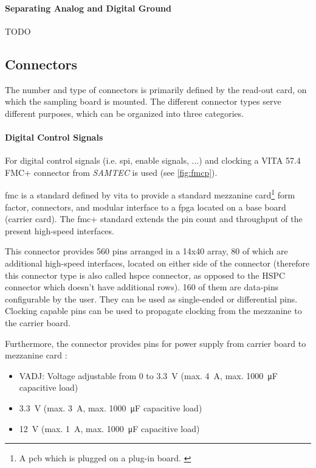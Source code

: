 \paragraph{Separating Analog and Digital Ground}
TODO



\subsection{Connectors}\label{sec:connectors}
The number and type of connectors is primarily defined by the read-out card, on which the sampling board is mounted. The different connector types serve different purposes, which can be organized into three categories.
\paragraph{Digital Control Signals}
For digital control signals (i.e. \gls{spi}, enable signals, ...) and clocking a VITA 57.4 FMC+ connector from \textit{SAMTEC} is used (see \autoref{fig:fmcp}). 

\gls{fmc} is a standard defined by \gls{vita} to provide a standard mezzanine card\footnote{A \gls{pcb} which is plugged on a plug-in board. \cite{mezzanine}} form factor, connectors, and modular interface to a \gls{fpga} located on a base board (carrier card).\cite{Seelam2009} The \gls{fmc}+ standard extends the pin count and throughput of the present high-speed interfaces. 

This connector provides 560 pins arranged in a 14x40 array, 80 of which are additional high-speed interfaces, located on either side of the connector (therefore this connector type is also called \gls{hspce} connector, as opposed to the HSPC connector which doesn't have additional rows). 160 of them are data-pins configurable by the user. They can be used as single-ended or differential pins. Clocking capable pins can be used to propagate clocking from the mezzanine to the carrier board. 

Furthermore, the connector provides pins for power supply from carrier board to mezzanine card \cite{fmc}:
\begin{itemize}
	\item VADJ: Voltage adjustable from 0 to \SI{3.3}{\volt} (max. \SI{4}{\ampere}, max. \SI{1000}{\micro \farad} capacitive load) 
	\item \SI{3.3}{\volt} (max. \SI{3}{\ampere}, max. \SI{1000}{\micro \farad} capacitive load)
	\item \SI{12}{\volt} (max. \SI{1}{\ampere}, max. \SI{1000}{\micro \farad} capacitive load)
\end{itemize}

